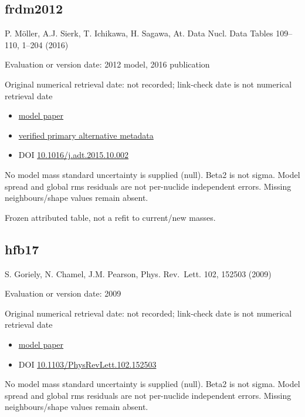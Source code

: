 \documentclass[
  11pt,
  letterpaper,
]{article}
\providecommand{\tightlist}{%
  \setlength{\itemsep}{0pt}\setlength{\parskip}{0pt}}
\begin{document}
\subsection{frdm2012}\label{frdm2012}

P. Möller, A.J. Sierk, T. Ichikawa, H. Sagawa, At. Data Nucl. Data
Tables 109--110, 1--204 (2016)

Evaluation or version date: 2012 model, 2016 publication

Original numerical retrieval date: not recorded; link-check date is not
numerical retrieval date

\begin{itemize}
\tightlist
\item
  \href{https://doi.org/10.1016/j.adt.2015.10.002}{model paper}
\item
  \href{https://arxiv.org/abs/1508.06294}{verified primary alternative
  metadata}
\item
  DOI
  \href{https://doi.org/10.1016/j.adt.2015.10.002}{10.1016/j.adt.2015.10.002}
\end{itemize}

No model mass standard uncertainty is supplied (null). Beta2 is not
sigma. Model spread and global rms residuals are not per-nuclide
independent errors. Missing neighbours/shape values remain absent.

Frozen attributed table, not a refit to current/new masses.

\subsection{hfb17}\label{hfb17}

S. Goriely, N. Chamel, J.M. Pearson, Phys. Rev.~Lett. 102, 152503 (2009)

Evaluation or version date: 2009

Original numerical retrieval date: not recorded; link-check date is not
numerical retrieval date

\begin{itemize}
\tightlist
\item
  \href{https://doi.org/10.1103/PhysRevLett.102.152503}{model paper}
\item
  DOI
  \href{https://doi.org/10.1103/PhysRevLett.102.152503}{10.1103/PhysRevLett.102.152503}
\end{itemize}

No model mass standard uncertainty is supplied (null). Beta2 is not
sigma. Model spread and global rms residuals are not per-nuclide
independent errors. Missing neighbours/shape values remain absent.
\end{document}
